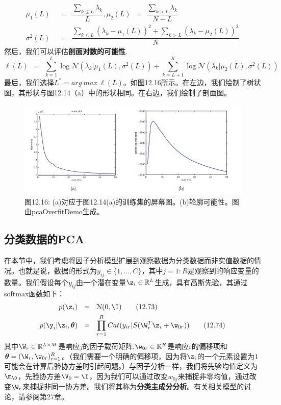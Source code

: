 \documentclass[a4paper]{article}
\begin{document}
\begin{align}
	\mu_1(L)\ \ &=\ \ \dfrac{\sum\nolimits_{k\le L}\lambda_{k}}{L},\mu_2(L)\ \ =\ \ \dfrac{\sum\nolimits_{k> L}\lambda_{k}}{N-L}\tag{12.70}\\
	\sigma^2(L)\ \ &=\ \ \dfrac{\sum\nolimits_{k\le L}(\lambda_{k}-\mu_1(L))^2+\sum\nolimits_{k> L}(\lambda_{k}-\mu_2(L))^2}{N}\tag{12.71}
\end{align}
然后，我们可以评估\textbf{剖面对数的可能性}.
\begin{equation}
	\ell(L)\ \ =\ \ \sum_{k=1}^{L}\log \mathcal{N}(\lambda_k|\mu_1(L),\sigma^2(L))+\sum_{k=L+1}^{K}\log \mathcal{N}(\lambda_k|\mu_2(L),\sigma^2(L))\tag{12.72}
\end{equation}
最后，我们选择$L^*=arg\ max\ \ell(L)$。如图12.16所示。在左边，我们绘制了树状图，其形状与图12.14（a）中的形状相同。在右边，我们绘制了剖面图。


\begin{figure}[h]
	\centering
	\includegraphics[width=0.7\linewidth]{fig/figure16}
	\caption*{图12.16: (a)对应于图12.14(a)的训练集的屏幕图。(b)轮廓可能性。图由pcaOverfitDemo生成。}
\end{figure}

\subsection{分类数据的PCA }
在本节中，我们考虑将因子分析模型扩展到观察数据为分类数据而非实值数据的情况。也就是说，数据的形式为$y_{ij}\in \{1,...,C\}$，其中$j=1:R$是观察到的响应变量的数量。我们假设每个$y_{ij}$由一个潜在变量$\z_i\in \mathbb{R}^L$生成，具有高斯先验，其通过softmax函数如下：
\begin{align}
	p(\z_i)\ \ &=\ \ \mathcal{N}(0,\I)\tag{12.73}\\
	p(\y_i|\z_i,\boldsymbol{\theta})\ \ &=\ \ \prod_{r=1}^{R}Cat(y_{ir}|S(\W_r^T\z_i+\w_{0r}))\tag{12.74}
\end{align}
其中$\W_r\in \mathbb{R}^{L\times M}$是响应$j$的因子载荷矩阵,$\w_{0r}\in \mathbb{R}^R$是响应r的偏移项和$\boldsymbol{\theta}=(\W_r,\w_{0r})_{r=1}^R$。（我们需要一个明确的偏移项，因为将$\z_i$的一个元素设置为1可能会在计算后验协方差时引起问题。）与因子分析一样，我们将先验均值定义为$\m_{\0}$，先验协方差$\V_0=\I$，因为我们可以通过改变$w_{0j}$来捕捉非零均值，通过改变$\W_r$来捕捉非同一协方差。我们将其称为\textbf{分类主成分分析}。有关相关模型的讨论，请参阅第27章。
\end{document}
